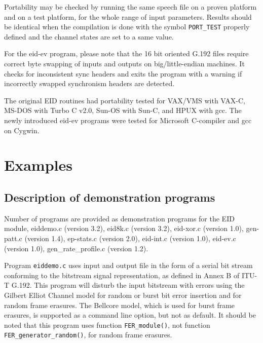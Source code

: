 Portability may be checked by running the same speech file on a proven
platform and on a test platform, for the whole range of input
parameters. Results should be identical when the compilation is done
with the symbol {\tt PORT\_TEST} properly defined and the channel
states are set to a same value.

For the eid-ev program, please note that the 16 bit oriented G.192 files 
require correct byte swapping of inputs and outputs on big/little-endian 
machines. It checks for inconsistent sync headers and exits the program with 
a warning if incorrectly swapped synchronism headers are detected. 

The original EID routines had portability tested for VAX/VMS with
VAX-C, MS-DOS with Turbo C v2.0, Sun-OS with Sun-C, and HPUX with
gcc. The newly introduced eid-ev programs were tested for Microsoft
C-compiler and gcc on Cygwin.


\section {Examples}

\subsection {Description of demonstration programs}

Number of programs are provided as demonstration programs for the EID
module, eiddemo.c (version 3.2), eid8k.c (version 3.2), eid-xor.c
(version 1.0), gen-patt.c (version 1.4), ep-stats.c (version 2.0),
eid-int.c (version 1.0), eid-ev.c (version 1.0), gen\_rate\_profile.c
(version 1.2).

Program {\tt eiddemo.c} uses input and output file in the form of a
serial bit stream conforming to the bitstream signal representation,
as defined in Annex B of ITU-T G.192. This program will disturb the
input bitstream with errors using the Gilbert Elliot Channel model for
random or burst bit error insertion and for random frame erasures. The
Bellcore model, which is used for burst frame erasures, is supported
as a command line option, but not as default. It should be noted that
this program uses function {\tt FER\_module()}, not function {\tt
FER\_generator\_random()}, for random frame erasures.

